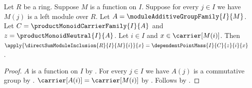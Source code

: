 \begin{proposition}\label{direct_sum_module_inclusion_apply}
    Let $R$ be a ring.
    Suppose $M$ is a function on $I$.
    Suppose for every $j\in I$ we have $M(j)$ is a left module over $R$.
    Let $A=\moduleAdditiveGroupFamily{I}{M}$.
    Let $C=\productMonoidCarrierFamily{I}{A}$ and
        $z=\productMonoidNeutral{I}{A}$.
    Let $i\in I$ and $x\in\carrier[M(i)]$.
    Then
        $\apply{\directSumModuleInclusion{R}{I}{M}{i}}{x}
            =\dependentPointMass{I}{C}{z}{i}{x}$.
\end{proposition}
\begin{proof}
    $A$ is a function on $I$ by
        .
    For every $j\in I$ we have $A(j)$ is a commutative group by
        .
    $\carrier[A(i)]=\carrier[M(i)]$ by
        .
    Follows by
        .
\end{proof}

